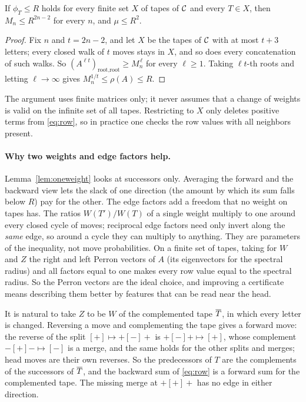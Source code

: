 \begin{corollary}\label{cor:paired}
If $\phi_T\le R$ holds for every finite set $X$ of tapes of $\mathcal{C}$ and every $T\in X$, then $M_n\le R^{2n-2}$ for
every $n$, and $\mu\le R^2$.
\end{corollary}

\begin{proof}
Fix $n$ and $t=2n-2$, and let $X$ be the tapes of $\mathcal{C}$ with at most $t+3$ letters; every closed walk of $t$ moves
stays in $X$, and so does every concatenation of such walks. So $(A^{\ell t})_{\text{root},\text{root}}\ge
M_n^{\,\ell}$ for every $\ell\ge1$. Taking $\ell t$-th roots and letting $\ell\to\infty$ gives
$M_n^{1/t}\le\rho(A)\le R$.
\end{proof}

The argument uses finite matrices only; it never assumes that a change of weights is valid on the infinite set of
all tapes.
Restricting to $X$ only deletes positive terms from \eqref{eq:row}, so in practice one checks the row values with all
neighbors present.

\paragraph{Why two weights and edge factors help.}
Lemma~\ref{lem:oneweight} looks at successors only. Averaging the forward and the backward view lets the slack of
one direction (the amount by which its sum falls below $R$) pay for the other. The edge factors add a freedom that no
weight on tapes has.
The ratios $W(T')/W(T)$ of a single weight multiply to one around every closed cycle of moves; reciprocal edge factors need
only invert along the \emph{same} edge, so around a cycle they can multiply to anything. They are parameters of the
inequality, not move probabilities. On a finite set of tapes, taking for $W$ and $Z$ the right and left Perron
vectors of $A$ (its eigenvectors for the spectral radius) and all factors equal to one makes every row value equal to
the spectral radius. So the Perron vectors are the ideal choice, and improving a certificate means describing them
better by features that can be read near the head.

It is natural to take $Z$ to be $W$ of the complemented tape $\overline{T}$, in which every letter is changed. Reversing a
move and complementing the tape gives a forward move: the reverse of the split $[+]\mapsto+[-]+$ is
$+[-]+\mapsto[+]$, whose complement $-[+]-\mapsto[-]$ is a merge, and the same holds for the other splits and merges;
head moves are their own reverses. So the predecessors of $T$ are the complements of the successors of $\overline{T}$, and
the backward sum of \eqref{eq:row} is a forward sum for the complemented tape. The missing merge at $+[+]+$ has no
edge in either direction.
